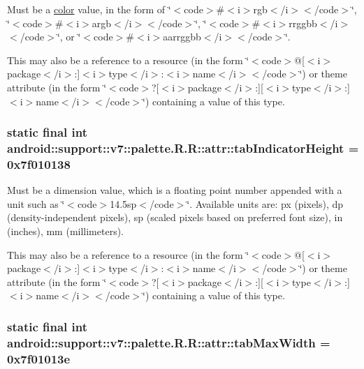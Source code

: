 Must be a \hyperlink{classandroid_1_1support_1_1v7_1_1palette_1_1_r_1_1color}{color} value, in the form of \char`\"{}$<$code$>$\#$<$i$>$rgb$<$/i$>$$<$/code$>$\char`\"{}, \char`\"{}$<$code$>$\#$<$i$>$argb$<$/i$>$$<$/code$>$\char`\"{}, \char`\"{}$<$code$>$\#$<$i$>$rrggbb$<$/i$>$$<$/code$>$\char`\"{}, or \char`\"{}$<$code$>$\#$<$i$>$aarrggbb$<$/i$>$$<$/code$>$\char`\"{}. 

This may also be a reference to a resource (in the form \char`\"{}$<$code$>$@\mbox{[}$<$i$>$package$<$/i$>$:\mbox{]}$<$i$>$type$<$/i$>$:$<$i$>$name$<$/i$>$$<$/code$>$\char`\"{}) or theme attribute (in the form \char`\"{}$<$code$>$?\mbox{[}$<$i$>$package$<$/i$>$:\mbox{]}\mbox{[}$<$i$>$type$<$/i$>$:\mbox{]}$<$i$>$name$<$/i$>$$<$/code$>$\char`\"{}) containing a value of this type. \hypertarget{classandroid_1_1support_1_1v7_1_1palette_1_1_r_1_1attr_0bee08ee77f36da25775c9066cd26c2f}{
\subsubsection[{tabIndicatorHeight}]{\setlength{\rightskip}{0pt plus 5cm}static final int android::support::v7::palette.R.R::attr::tabIndicatorHeight = 0x7f010138}}
\label{classandroid_1_1support_1_1v7_1_1palette_1_1_r_1_1attr_0bee08ee77f36da25775c9066cd26c2f}


Must be a dimension value, which is a floating point number appended with a unit such as \char`\"{}$<$code$>$14.5sp$<$/code$>$\char`\"{}. Available units are: px (pixels), dp (density-independent pixels), sp (scaled pixels based on preferred font size), in (inches), mm (millimeters). 

This may also be a reference to a resource (in the form \char`\"{}$<$code$>$@\mbox{[}$<$i$>$package$<$/i$>$:\mbox{]}$<$i$>$type$<$/i$>$:$<$i$>$name$<$/i$>$$<$/code$>$\char`\"{}) or theme attribute (in the form \char`\"{}$<$code$>$?\mbox{[}$<$i$>$package$<$/i$>$:\mbox{]}\mbox{[}$<$i$>$type$<$/i$>$:\mbox{]}$<$i$>$name$<$/i$>$$<$/code$>$\char`\"{}) containing a value of this type. \hypertarget{classandroid_1_1support_1_1v7_1_1palette_1_1_r_1_1attr_2acb16ed7ec7e88f8add595cef8414ea}{
\subsubsection[{tabMaxWidth}]{\setlength{\rightskip}{0pt plus 5cm}static final int android::support::v7::palette.R.R::attr::tabMaxWidth = 0x7f01013e}}
\label{classandroid_1_1support_1_1v7_1_1palette_1_1_r_1_1attr_2acb16ed7ec7e88f8add595cef8414ea}


